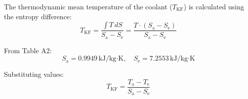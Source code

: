 The thermodynamic mean temperature of the coolant (\( T_{\text{KF}} \)) is calculated using the entropy difference:  
\[
T_{\text{KF}} = \frac{\int T \, dS}{S_{\text{a}} - S_{\text{e}}} = \frac{T \cdot (S_{\text{a}} - S_{\text{e}})}{S_{\text{a}} - S_{\text{e}}}
\]  

From Table A2:  
\[
S_{\text{a}} = 0.9949 \, \text{kJ/kg·K}, \quad S_{\text{e}} = 7.2553 \, \text{kJ/kg·K}
\]  

Substituting values:  
\[
T_{\text{KF}} = \frac{T_{\text{a}} - T_{\text{e}}}{S_{\text{a}} - S_{\text{e}}}
\]